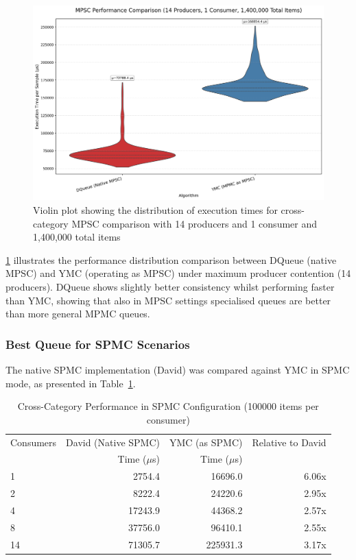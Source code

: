 \begin{figure}[htb]
\centering
\caption{Violin plot showing the distribution of execution times for cross-category MPSC comparison with 14 producers and 1 consumer and 1,400,000 total items}
\label{fig:cross-mpsc-violin-14p}
\includegraphics[width=\textwidth]{images/results/best_in_mpsc_performance_violin_14P1C.png}
\end{figure}

\cref{fig:cross-mpsc-violin-14p} illustrates the performance distribution comparison between DQueue (native MPSC) and \ac{YMC} (operating as MPSC) under maximum producer contention (14 producers). DQueue shows slightly better consistency whilst performing faster than \ac{YMC}, showing that also in \ac{MPSC} settings specialised queues are better than more general \ac{MPMC} queues.

\subsubsection{Best Queue for \ac{SPMC} Scenarios}\label{subsubsec:cross-spmc}
The native \ac{SPMC} implementation (David) was compared against \ac{YMC} in \ac{SPMC} mode, as presented in Table~\ref{tab:best-spmc}.

\begin{table}[htb]
\centering
\caption{Cross-Category Performance in \ac{SPMC} Configuration (100000 items per consumer)}
\label{tab:best-spmc}
\begin{tabular}{@{}lrrr@{}}
\toprule
Consumers & David (Native \ac{SPMC}) & \ac{YMC} (as \ac{SPMC}) & Relative to David \\
& Time ($\mu$s) & Time ($\mu$s) & \\
\midrule
1 & 2754.4 & 16696.0 & 6.06x \\
2 & 8222.4 & 24220.6 & 2.95x \\
4 & 17243.9 & 44368.2 & 2.57x \\
8 & 37756.0 & 96410.1 & 2.55x \\
14 & 71305.7 & 225931.3 & 3.17x \\
\bottomrule
\end{tabular}
\end{table}

